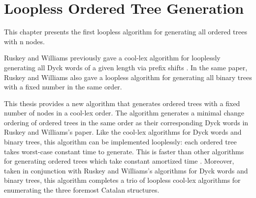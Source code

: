 \section{Loopless Ordered Tree Generation}
This chapter presents the first loopless algorithm for generating all ordered trees with n nodes. 

Ruskey and Williams previously gave a cool-lex algorithm for looplessly generating all Dyck words  of a given length via prefix shifts \cite{ruskey2008generating}.  In the same paper, Ruskey and Williams also gave a loopless algorithm for generating all binary trees with a fixed number in the same order.

This thesis provides a new algorithm that generates ordered trees with a fixed number of nodes in a cool-lex order. The algorithm generates a minimal change ordering of ordered trees in the same order as their corresponding Dyck words in Ruskey and Williams's paper. Like the cool-lex algorithms for Dyck words and binary trees, this algorithm can be implemented looplessly: each ordered tree takes worst-case constant time to generate. This is faster than other algorithms for generating ordered trees which take constant amortized time \cite{parque2021efficient} \cite{er1985lexotrees} \cite{zaks1980lexotrees} \cite{skarbek1988pointerotrees}. Moreover, taken in conjunction with Ruskey and Williams's algorithms for Dyck words and binary trees, this algorithm completes a trio of loopless cool-lex algorithms for enumerating the three foremost Catalan structures.



